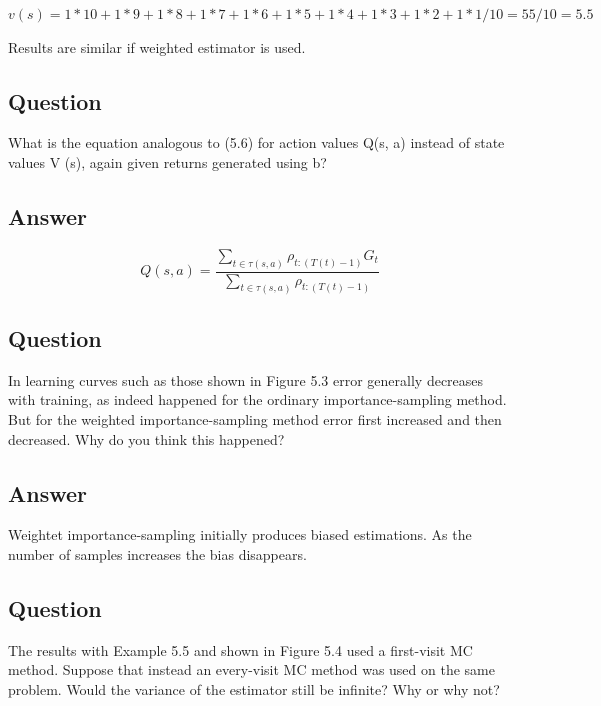 \documentclass[11pt]{article}
\begin{document}
    $ v(s) = 1 * 10 + 1 * 9 + 1 * 8 + 1 * 7 + 1 * 6 + 1 * 5 + 1* 4 + 1 * 3 + 1 * 2 + 1 * 1 / 10 =  55 / 10 = 5.5 $

    Results are similar if weighted estimator is used.

    \subsection{Question}

    What is the equation analogous to (5.6) for action values Q(s, a) instead of state values V (s), again given returns generated using b?


    \subsection*{Answer}

    \begin{equation}
        Q(s,a) = \frac{\sum_{t \in \tau (s,a) } \rho_{t:(T(t)-1)} G_{t} }{ \sum_{t \in \tau (s,a) } \rho_{t:(T(t)-1)} }
    \end{equation}

    \subsection{Question}

    In learning curves such as those shown in Figure 5.3 error generally decreases with training, as indeed happened for the ordinary importance-sampling method.
    But for the weighted importance-sampling method error first increased and then decreased.
    Why do you think this happened?

    \subsection*{Answer}

    Weightet importance-sampling initially produces biased estimations.
    As the number of samples increases the bias disappears.

    \subsection{Question}

    The results with Example 5.5 and shown in Figure 5.4 used a first-visit MC method.
    Suppose that instead an every-visit MC method was used on the same problem.
    Would the variance of the estimator still be infinite? Why or why not?
\end{document}
